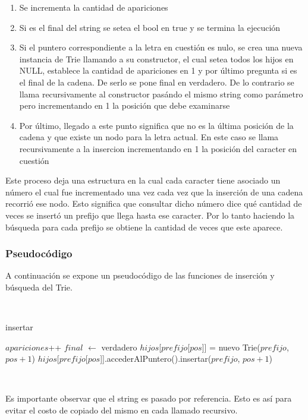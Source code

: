 \begin{enumerate}
\item Se incrementa la cantidad de apariciones
\item Si es el final del string se setea el bool en true y se termina la
ejecución
\item Si el puntero correspondiente a la letra en cuestión es nulo, se crea
una nueva instancia de Trie llamando a su constructor, el cual setea todos los
hijos en NULL, establece la cantidad de apariciones en 1 y por último pregunta
si es el final de la cadena. De serlo se pone final en verdadero. De lo
contrario se llama recursivamente al constructor pasándo el mismo string como
parámetro pero incrementando en 1 la posición que debe examinarse
\item Por último, llegado a este punto significa que no es la última posición
de la cadena y que existe un nodo para la letra actual. En este caso se llama
recursivamente a la insercion incrementando en 1 la posición del caracter en
cuestión
\end{enumerate}

Este proceso deja una estructura en la cual cada caracter tiene asociado un
número el cual fue incrementado una vez cada vez que la inserción de una
cadena recorrió ese nodo. Esto significa que consultar dicho número dice
qué cantidad de veces se insertó un prefijo que llega hasta ese caracter.
Por lo tanto haciendo la búsqueda para cada prefijo se obtiene la cantidad de
veces que este aparece.

\subsubsection{Pseudocódigo}

A continuación se expone un pseudocódigo de las funciones de inserción y
búsqueda del Trie.

~

\begin{algorithm}[H]
	\caption{insertar}

	$apariciones$++ \;
	 {
		$final$ $\gets$ verdadero \;
	} {
		 {
			$hijos$[$prefijo$[$pos$]] = nuevo Trie($prefijo$, $pos + 1$) \;
		} {
			$hijos$[$prefijo$[$pos$]].accederAlPuntero().insertar($prefijo$, $pos + 1$) \;
		}
	}
\end{algorithm}

~

Es importante observar que el string es pasado por referencia. Esto es así
para evitar el costo de copiado del mismo en cada llamado recursivo.

